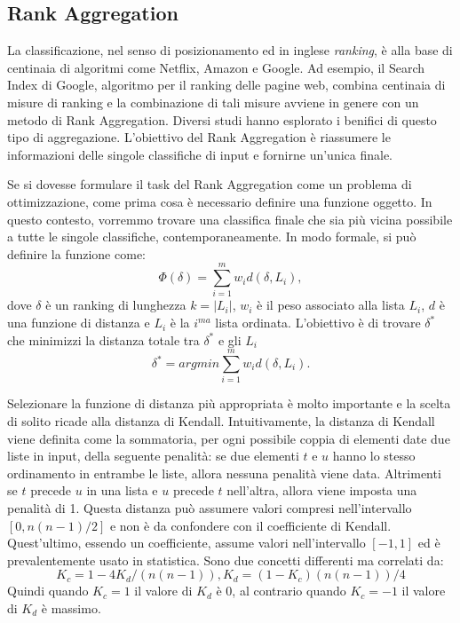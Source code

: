 \subsection{Rank Aggregation}
La classificazione, nel senso di posizionamento ed in inglese \textit{ranking}, è alla base di centinaia di algoritmi come Netflix, Amazon e Google. 
Ad esempio, il Search Index di Google, algoritmo per il ranking delle pagine web, combina centinaia di misure di ranking e la combinazione di tali misure avviene in genere con un metodo di Rank Aggregation. Diversi studi hanno esplorato i benifici di questo tipo di aggregazione\cite{https://doi.org/10.48550/arxiv.2206.12088,https://doi.org/10.48550/arxiv.2202.05433}.
L'obiettivo del Rank Aggregation è riassumere le informazioni delle singole classifiche di input e fornirne un'unica finale. 

Se si dovesse formulare il task del Rank Aggregation come un problema di ottimizzazione, come prima cosa è necessario definire una funzione oggetto. In questo contesto, vorremmo trovare una classifica finale che sia più vicina possibile a tutte le singole classifiche, contemporaneamente. In modo formale, si può definire la funzione come: \[ \Phi(\delta) = \sum_{i=1}^{m} w_id(\delta,L_i), \]	
dove $\delta$ è un ranking di lunghezza $k=|L_i|$, $w_i$ è il peso associato alla lista $L_i$, $d$ è una funzione di distanza e $L_i$ è la $i^{ma}$ lista ordinata.
L'obiettivo è di trovare $\delta^*$ che minimizzi la distanza totale tra $\delta^*$ e gli $L_i$
\[ \delta^* = arg min \sum_{i=1}^{m} w_id(\delta,L_i). \]

Selezionare la funzione di distanza più appropriata è molto importante e la scelta di solito ricade alla distanza di Kendall.
Intuitivamente, la distanza di Kendall viene definita come la sommatoria, per ogni possibile coppia di elementi date due liste in input, della seguente penalità: se due elementi $t$ e $u$ hanno lo stesso ordinamento in entrambe le liste, allora nessuna penalità viene data. Altrimenti se $t$ precede $u$ in una lista e $u$ precede $t$ nell'altra, allora viene imposta una penalità di 1.
Questa distanza può assumere valori compresi nell'intervallo $[0,n(n-1)/2]$ e non è da confondere con il coefficiente di Kendall. Quest'ultimo, essendo un coefficiente, assume valori nell'intervallo $[-1,1]$ ed è prevalentemente usato in statistica. Sono due concetti differenti ma correlati da:
\[K_c=1-4K_d/(n(n-1)), K_d = (1-K_c)(n(n-1))/4\]
Quindi quando $K_c=1$ il valore di $K_d$ è 0, al contrario quando $K_c=-1$ il valore di $K_d$ è massimo.

